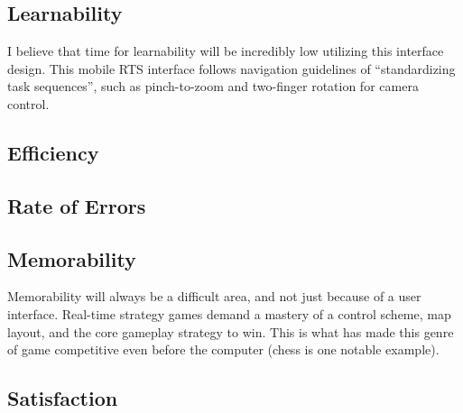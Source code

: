 \documentclass[11pt]{article}
\begin{document}
	\subsection{Learnability}
	I believe that time for learnability will be incredibly low utilizing this interface design. This mobile RTS interface follows navigation guidelines of ``standardizing task sequences'', such as pinch-to-zoom and two-finger rotation for camera control.
	\subsection{Efficiency}
	\subsection{Rate of Errors}
	\subsection{Memorability}
	Memorability will always be a difficult area, and not just because of a user interface. Real-time strategy games demand a mastery of a control scheme, map layout, and the core gameplay strategy to win. This is what has made this genre of game competitive even before the computer (chess is one notable example).
	\subsection{Satisfaction}
\end{document}
